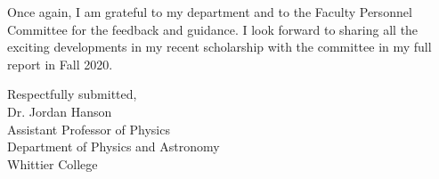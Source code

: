 \documentclass[../../main.tex]{subfiles}
\begin{document}
Once again, I am grateful to my department and to the Faculty Personnel Committee for the feedback and guidance.  I look forward to sharing all the exciting developments in my recent scholarship with the committee in my full report in Fall 2020. \\ \hspace{0.1cm}

Respectfully submitted, \\
Dr. Jordan Hanson\\
Assistant Professor of Physics\\
Department of Physics and Astronomy\\
Whittier College
\end{document}
